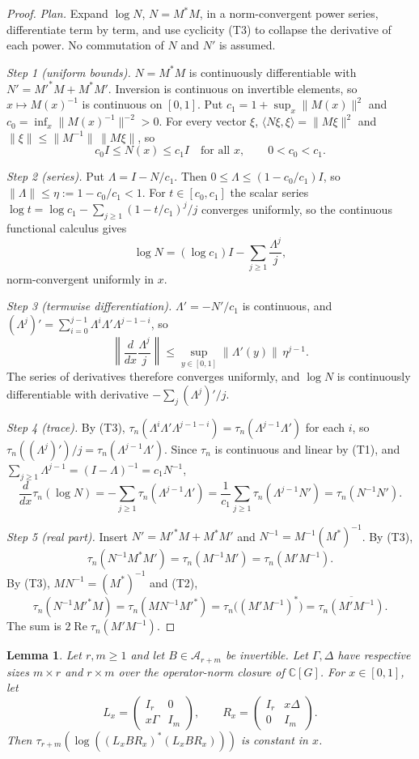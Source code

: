 \documentclass[11pt]{article}
\newtheorem{lemma}[theorem]{Lemma}
\theoremstyle{remark}
\numberwithin{equation}{section}
\newcommand{\C}{\mathbb C}
\begin{document}
\begin{proof}
\emph{Plan.} Expand $\log N$, $N=M^*M$, in a norm-convergent power series, differentiate term by term, and use cyclicity (T3) to collapse the derivative of each power. No commutation of $N$ and $N'$ is assumed.

\emph{Step 1 (uniform bounds).} $N=M^*M$ is continuously differentiable with $N'=M'^*M+M^*M'$. Inversion is continuous on invertible elements, so $x\mapsto M(x)^{-1}$ is continuous on $[0,1]$. Put $c_1=1+\sup_x\|M(x)\|^2$ and $c_0=\inf_x\|M(x)^{-1}\|^{-2}>0$. For every vector $\xi$, $\langle N\xi,\xi\rangle=\|M\xi\|^2$ and $\|\xi\|\le\|M^{-1}\|\,\|M\xi\|$, so
\[
 c_0I\le N(x)\le c_1I\quad\text{for all }x,\qquad 0<c_0<c_1.
\]

\emph{Step 2 (series).} Put $\Lambda=I-N/c_1$. Then $0\le\Lambda\le(1-c_0/c_1)I$, so $\|\Lambda\|\le\eta:=1-c_0/c_1<1$. For $t\in[c_0,c_1]$ the scalar series $\log t=\log c_1-\sum_{j\ge1}(1-t/c_1)^j/j$ converges uniformly, so the continuous functional calculus gives
\[
 \log N=(\log c_1)I-\sum_{j\ge1}\frac{\Lambda^j}{j},
\]
norm-convergent uniformly in $x$.

\emph{Step 3 (termwise differentiation).} $\Lambda'=-N'/c_1$ is continuous, and $(\Lambda^j)'=\sum_{i=0}^{j-1}\Lambda^i\Lambda'\Lambda^{j-1-i}$, so
\[
 \left\|\frac{d}{dx}\frac{\Lambda^j}{j}\right\|
 \le\sup_{y\in[0,1]}\|\Lambda'(y)\|\,\eta^{j-1}.
\]
The series of derivatives therefore converges uniformly, and $\log N$ is continuously differentiable with derivative $-\sum_j(\Lambda^j)'/j$.

\emph{Step 4 (trace).} By (T3), $\tau_n(\Lambda^i\Lambda'\Lambda^{j-1-i})=\tau_n(\Lambda^{j-1}\Lambda')$ for each $i$, so $\tau_n((\Lambda^j)')/j=\tau_n(\Lambda^{j-1}\Lambda')$. Since $\tau_n$ is continuous and linear by (T1), and $\sum_{j\ge1}\Lambda^{j-1}=(I-\Lambda)^{-1}=c_1N^{-1}$,
\[
 \frac{d}{dx}\tau_n(\log N)
 =-\sum_{j\ge1}\tau_n(\Lambda^{j-1}\Lambda')
 =\frac1{c_1}\sum_{j\ge1}\tau_n(\Lambda^{j-1}N')
 =\tau_n(N^{-1}N').
\]

\emph{Step 5 (real part).} Insert $N'=M'^*M+M^*M'$ and $N^{-1}=M^{-1}(M^*)^{-1}$. By (T3),
\[
 \tau_n(N^{-1}M^*M')=\tau_n(M^{-1}M')=\tau_n(M'M^{-1}).
\]
By (T3), $MN^{-1}=(M^*)^{-1}$ and (T2),
\[
 \tau_n(N^{-1}M'^*M)=\tau_n(MN^{-1}M'^*)=\tau_n\bigl((M'M^{-1})^*\bigr)
 =\overline{\tau_n(M'M^{-1})}.
\]
The sum is $2\operatorname{Re}\tau_n(M'M^{-1})$.
\end{proof}

\begin{lemma}\label{lem:shears}
Let $r,m\ge1$ and let $B\in\mathcal A_{r+m}$ be invertible.
Let $\Gamma,\Delta$ have respective sizes $m\times r$ and $r\times m$ over
the operator-norm closure of $\C[G]$. For $x\in[0,1]$, let
\[
 L_x=\begin{pmatrix}I_r&0\\x\Gamma&I_m\end{pmatrix},\qquad
 R_x=\begin{pmatrix}I_r&x\Delta\\0&I_m\end{pmatrix}.
\]
Then $\tau_{r+m}(\log((L_xBR_x)^*(L_xBR_x)))$ is constant in $x$.
\end{lemma}
\end{document}
